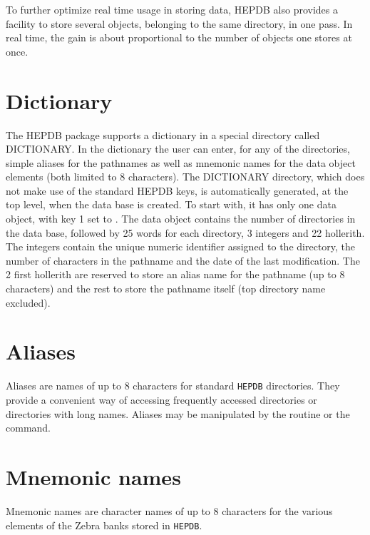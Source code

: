 To further optimize real time usage in storing data, HEPDB also
provides a facility to store several objects, belonging to the same
directory, in one pass. In real time, the gain is about proportional to
the number of objects one stores at once.

\section{Dictionary}

The HEPDB package supports a dictionary in a special directory called
DICTIONARY. In the dictionary the user can enter, for any of the
directories, simple aliases for the pathnames as well as mnemonic names
for the data object elements (both limited to 8 characters). The
DICTIONARY directory, which does not make use of the standard HEPDB keys,
is automatically generated, at the top level, when the data base is
created. To start with, it has only one data object, with key 1 set to
. The data object contains the number of directories in the data base,
followed by 25 words for each directory, 3 integers and 22 hollerith.
The integers contain the unique numeric identifier assigned to the
directory, the number of characters in the pathname and the date of the
last modification. The 2 first hollerith are reserved to store an alias
name for the pathname (up to 8 characters) and the rest to store the
pathname itself (top directory name excluded).

\section{Aliases}
\label{HDB-ALIAS}

Aliases are names of up to 8 characters for standard {\tt HEPDB}
directories. They provide a convenient way of accessing frequently
accessed directories or directories with long names.
Aliases may be manipulated by the  routine or the
 command.

\section{Mnemonic names}
\label{HDB-MNEMONIC}

Mnemonic names are character names of up to 8 characters for the
various elements of the Zebra banks stored in {\tt HEPDB}.

